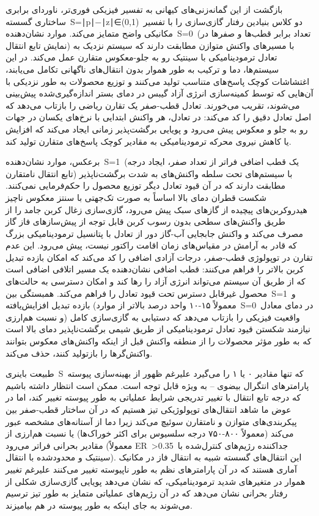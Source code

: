 \documentclass[12pt, a4paper]{article}
\begin{document}
بازگشت از این گمانه‌زنی‌های کیهانی به تفسیر فیزیکی فوری‌تر، ناوردای برابری ساختاری گسسته S=∣p∣−∣z∣∈(0,1) دو کلاس بنیادین رفتار گازی‌سازی را با تفسیر مکانیکی واضح متمایز می‌کند. موارد نشان‌دهنده S=0 (تعداد برابر قطب‌ها و صفرها در نمایش تابع انتقال) با مسیرهای واکنش متوازن مطابقت دارند که سیستم نزدیک به تعادل ترمودینامیکی با سینتیک رو به جلو-معکوس متقارن عمل می‌کند. در این سیستم‌ها، دما و ترکیب به طور هموار بدون انتقال‌های ناگهانی تکامل می‌یابند، اغتشاشات کوچک پاسخ‌های متناسب تولید می‌کنند و توزیع محصولات به طور نزدیکی با آن‌هایی که توسط کمینه‌سازی انرژی آزاد گیبس در دمای بستر اندازه‌گیری‌شده پیش‌بینی می‌شوند، تقریب می‌خورند. تعادل قطب-صفر یک تقارن ریاضی را بازتاب می‌دهد که اصل تعادل دقیق را کد می‌کند: در تعادل، هر واکنش ابتدایی با نرخ‌های یکسان در جهات رو به جلو و معکوس پیش می‌رود و پویایی برگشت‌پذیر زمانی ایجاد می‌کند که افزایش یا کاهش نیروی محرکه ترمودینامیکی به مقادیر کوچک پاسخ‌های متقارن تولید کند.

برعکس، موارد نشان‌دهنده S=1 (یک قطب اضافی فراتر از تعداد صفر، ایجاد درجه تابع انتقال نامتقارن) با سیستم‌های تحت سلطه واکنش‌های به شدت برگشت‌ناپذیر مطابقت دارند که در آن قیود تعادل دیگر توزیع محصول را حکم‌فرمایی نمی‌کنند. شکست قطران دمای بالا اساساً به صورت تک‌جهتی با سنتز معکوس ناچیز هیدروکربن‌های پیچیده از گازهای سبک پیش می‌رود، گازی‌سازی زغال کربن جامد را از طریق واکنش‌های سطحی بدون رسوب کربن قابل توجه از پیش‌سازهای فاز گاز مصرف می‌کند و واکنش جابجایی آب-گاز دور از تعادل با پتانسیل ترمودینامیکی بزرگ که قادر به آرامش در مقیاس‌های زمان اقامت راکتور نیست، پیش می‌رود. این عدم تقارن در توپولوژی قطب-صفر، درجات آزادی اضافی را کد می‌کند که امکان بازده تبدیل کربن بالاتر را فراهم می‌کنند: قطب اضافی نشان‌دهنده یک مسیر اتلافی اضافی است که از طریق آن سیستم می‌تواند انرژی آزاد را رها کند و امکان دسترسی به حالت‌های محصول غیرقابل دسترس تحت قیود تعادل را فراهم می‌کند. همبستگی بین S=1 و بازده تبدیل افزایش‌یافته (معمولاً ۱۵-۱۰ واحد درصد بالاتر از موارد S=0 در دمای معادل و نسبت هم‌ارزی) واقعیت فیزیکی را بازتاب می‌دهد که دستیابی به گازی‌سازی کامل نیازمند شکستن قیود تعادل ترمودینامیکی از طریق شیمی برگشت‌ناپذیر دمای بالا است که به طور مؤثر محصولات را از منطقه واکنش قبل از اینکه واکنش‌های معکوس بتوانند واکنش‌گرها را بازتولید کنند، حذف می‌کند.

طبیعت باینری S که تنها مقادیر ۰ یا ۱ را می‌گیرد علیرغم ظهور از بهینه‌سازی پیوسته پارامترهای انتگرال بیضوی – به ویژه قابل توجه است. ممکن است انتظار داشته باشیم که درجه تابع انتقال با تغییر تدریجی شرایط عملیاتی به طور پیوسته تغییر کند، اما در عوض ما شاهد انتقال‌های توپولوژیکی تیز هستیم که در آن ساختار قطب-صفر بین پیکربندی‌های متوازن و نامتقارن سوئیچ می‌کند زیرا دما از آستانه‌های مشخصه عبور می‌کند (معمولاً ۸۰۰-۷۵۰ درجه سلسیوس برای اکثر خوراک‌ها) یا نسبت هم‌ارزی از مقادیر بحرانی فراتر می‌رود (معمولاً ER >0.35 جداکننده رژیم‌های کنترل‌شده با سینتیک و محدودشده با انتقال). این انتقال‌های گسسته شبیه به انتقال فاز در مکانیک آماری هستند که در آن پارامترهای نظم به طور ناپیوسته تغییر می‌کنند علیرغم تغییر هموار در متغیرهای شدید ترمودینامیکی، که نشان می‌دهد پویایی گازی‌سازی شکلی از رفتار بحرانی نشان می‌دهد که در آن رژیم‌های عملیاتی متمایز به طور تیز ترسیم می‌شوند به جای اینکه به طور پیوسته در هم بیامیزند.
\end{document}
